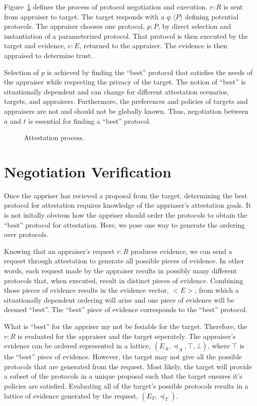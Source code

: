 \documentclass[sigconf,authordraft]{acmart}
\begin{document}
Figure~\ref{fig:sequence-fig} defines the process of protocol
negotiation and execution.  $r:R$ is sent from appraiser to target.
The target responds with a $q:\langle P\rangle$ defining potential
protocols.  The appraiser chooses one protocol, $p:P$, by direct
selection and instantiation of a parameterized protocol.  That
protocol is then executed by the target and evidence, $e:E$, returned
to the appraiser.  The evidence is then appraised to determine trust.

Selection of $p$ is achieved by finding the ``best'' protocol that
satisfies the needs of the appraiser while respecting the privacy of
the target. The notion of ``best'' is situationally dependent and can
change for different attestation scenarios, targets, and appraisers.
Furthermore, the preferences and policies of targets and appraisers
are not and should not be globally known.  Thus, negotiation between
$a$ and $t$ is essential for finding a ``best'' protocol.

\begin{figure}[hbtp]
  \centering 
  \caption[Attestation process]{Attestation process.}
  \label{fig:sequence-fig}
\end{figure}

\section{Negotiation Verification}

Once the appriser has recieved a proposal from the target, determining
the best protocol for attestation requires knowledge of the
appriaser's attestation goals. It is not initally obvious how the
appriser should order the protocols to obtain the ``best'' protocol for
attestation. Here, we pose one way to generate the ordering over
protocols.

Knowing that an appraiser's request $r:R$ produces evidence, we can
send a request through attestation to generate all possible pieces of
evidence. In other words, each request made by the appraiser
results in possibly many different protocols that, when executed,
result in distinct pieces of evidence. Combining those pieces of
evidence results in the evidence vector,  $<E>$, from which a situationally
dependent ordering will arise and one piece of evidence will be deemed
``best''. The ``best'' piece of evidence corresponds to the ``best'' protocol. 

What is ``best'' for the appriser my not be fesiable for the
target. Therefore, the $r:R$ is evaluated for the appraiser and the
target seperately. The appraiser's evidence can be ordered represented
in a lattice, $(E_A,\preceq_A, \top, \bot)$, where $\top$ is the
``best'' piece of evidence. However, the target may not give all the
possible protocols that are generated from the request. Most likely,
the target will provide a subset of the protocols in a unique proposal
such that the target ensures it's policies are satisfied. Evaluating
all of the target's possible protocols results in a lattice of
evidence generated by the request, $(E_T,\preceq_T)$.
\end{document}
